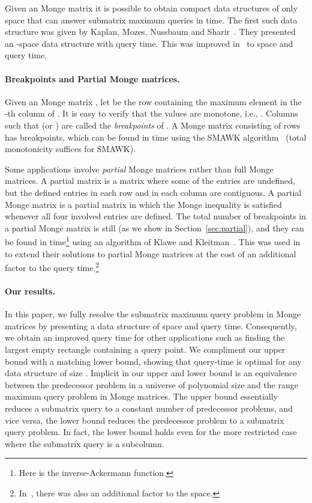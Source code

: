 \documentclass{llncs}
\begin{document}
Given an  Monge matrix  it is possible to obtain compact data structures of only  space that can answer submatrix maximum queries in  time.  The first such data structure was given by 
Kaplan, Mozes, Nussbaum and
Sharir~\cite{KaplanMozesNussbaumSharir}. 
They presented an -space data structure with   query time.
This was improved in~\cite{ourICALP}  to  space and  query time.  

\paragraph{\bf Breakpoints and Partial Monge matrices.}
Given an  Monge matrix , let  be the row containing the maximum element in the -th
column of . It is easy to verify that the  values are monotone, i.e., .
Columns  such that  (or ) are called the {\em breakpoints} of . A Monge matrix
consisting of  rows has  breakpoints, which can be found in
 time using the SMAWK algorithm~\cite{SMAWK} (total monotonicity
suffices for SMAWK). 

Some applications involve  {\em partial} Monge matrices rather than
full Monge matrices.
A partial matrix is a matrix where some of the
entries are undefined, but the defined entries in each row
and in each column are contiguous. A partial Monge matrix is a partial matrix in which the Monge inequality is satisfied whenever all four involved entries are defined. The total number of breakpoints in a partial Monge matrix is still  (as we show in Section~\ref{sec:partial}), and they can be found in  time\footnote{Here  is the inverse-Ackermann function.} using an algorithm of Klawe and Kleitman~\cite{KK89}. This was used in~\cite{ourICALP,KaplanMozesNussbaumSharir} to extend their solutions to partial Monge matrices at the cost of an additional  factor to the query time.\footnote{In~\cite{KaplanMozesNussbaumSharir}, there was also an additional  factor to the space.}

\paragraph{\bf Our results.} 
In this paper, we fully resolve the submatrix maximum
query problem in  Monge matrices by presenting a data structure of  space and  query time. 
Consequently, we obtain an improved query time for other applications such as finding the largest empty
rectangle containing a query point. 
We compliment our upper bound with a matching lower bound, showing
that  query-time is optimal for any data structure of
size . 
Implicit in our upper and lower bound is an equivalence
between the predecessor problem in a universe of polynomial size and the range maximum query problem in
Monge matrices. The upper bound essentially reduces a submatrix
query to a constant number of predecessor problems, and vice versa, the lower bound
reduces the predecessor problem to a submatrix query problem. In fact, the lower bound holds even for the more restricted case where the submatrix query is a subcolumn.
\end{document}
